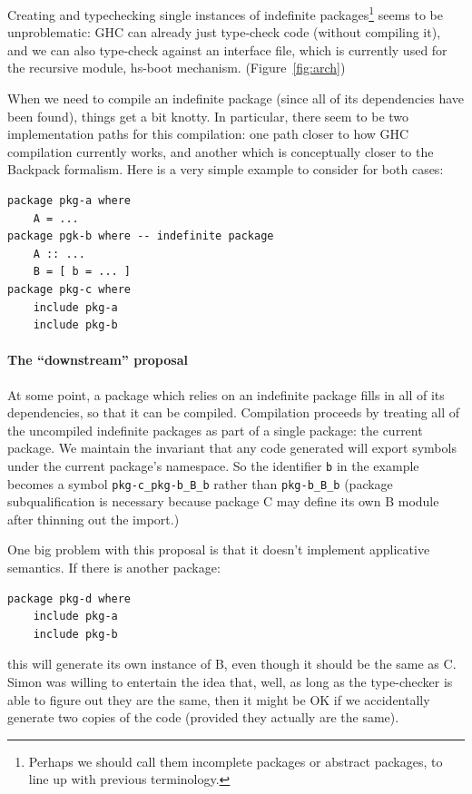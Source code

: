 \documentclass{article}
\begin{document}
Creating and typechecking single instances of indefinite packages\footnote{Perhaps we should call them incomplete packages or abstract packages, to line up with previous terminology.} seems to
be unproblematic: GHC can already just type-check code (without compiling it),
and we can also type-check against an interface file, which is currently used for
the recursive module, hs-boot mechanism. (Figure~\ref{fig:arch})

When we need to compile an indefinite package (since all of its
dependencies have been found), things get a bit knotty.  In particular,
there seem to be two implementation paths for this compilation: one path
closer to how GHC compilation currently works, and another which is
conceptually closer to the Backpack formalism.  Here is a very simple
example to consider for both cases:

\begin{verbatim}
package pkg-a where
    A = ...
package pgk-b where -- indefinite package
    A :: ...
    B = [ b = ... ]
package pkg-c where
    include pkg-a
    include pkg-b
\end{verbatim}

\paragraph{The ``downstream'' proposal}  At some point, a package which
relies on an indefinite package fills in all of its dependencies, so
that it can be compiled.  Compilation proceeds by treating all of the
uncompiled indefinite packages as part of a single package: the current
package.  We maintain the invariant that any code generated will export
symbols under the current package's namespace.  So the identifier
\verb|b| in the example becomes a symbol \verb|pkg-c_pkg-b_B_b| rather
than \verb|pkg-b_B_b| (package subqualification is necessary because
package C may define its own B module after thinning out the import.)

One big problem with this proposal is that it doesn't implement applicative
semantics.  If there is another package:

\begin{verbatim}
package pkg-d where
    include pkg-a
    include pkg-b
\end{verbatim}

this will generate its own instance of B, even though it should be the same
as C.  Simon was willing to entertain the idea that, well, as long as the
type-checker is able to figure out they are the same, then it might be OK
if we accidentally generate two copies of the code (provided they actually
are the same).
\end{document}
